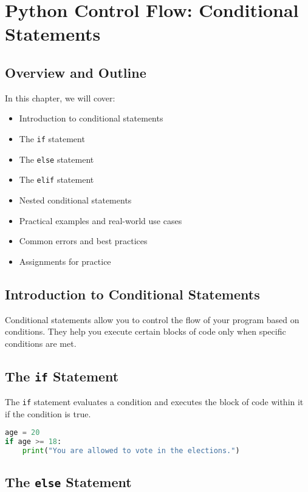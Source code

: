 \chapter{Python Control Flow: Conditional Statements}

\section{Overview and Outline}

In this chapter, we will cover:
\begin{itemize}
    \item Introduction to conditional statements
    \item The \texttt{if} statement
    \item The \texttt{else} statement
    \item The \texttt{elif} statement
    \item Nested conditional statements
    \item Practical examples and real-world use cases
    \item Common errors and best practices
    \item Assignments for practice
\end{itemize}

\section{Introduction to Conditional Statements}

Conditional statements allow you to control the flow of your program based on conditions.  
They help you execute certain blocks of code only when specific conditions are met.

\section{The \texttt{if} Statement}

The \texttt{if} statement evaluates a condition and executes the block of code within it if the condition is true.

\begin{lstlisting}[language=Python]
age = 20
if age >= 18:
    print("You are allowed to vote in the elections.")
\end{lstlisting}

\section{The \texttt{else} Statement}

